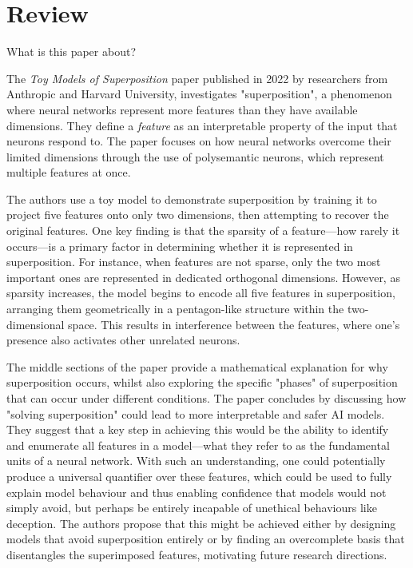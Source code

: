 \section{Review}
\label{sec:review}

What is this paper about?

The \textit{Toy Models of Superposition} paper \cite{elhage2022toy} published in 2022 by researchers from Anthropic and Harvard University, investigates "superposition", a phenomenon where neural networks represent more features than they have available dimensions.
They define a \textit{feature} as an interpretable property of the input that neurons respond to.
The paper focuses on how neural networks overcome their limited dimensions through the use of polysemantic neurons, which represent multiple features at once.

The authors use a toy model to demonstrate superposition by training it to project five features onto only two dimensions, then attempting to recover the original features.
One key finding is that the sparsity of a feature—how rarely it occurs—is a primary factor in determining whether it is represented in superposition. For instance, when features are not sparse, only the two most important ones are represented in dedicated orthogonal dimensions.
However, as sparsity increases, the model begins to encode all five features in superposition, arranging them geometrically in a pentagon-like structure within the two-dimensional space.
This results in interference between the features, where one's presence also activates other unrelated neurons.

The middle sections of the paper provide a mathematical explanation for why superposition occurs, whilst also exploring the specific "phases" of superposition that can occur under different conditions. 
The paper concludes by discussing how "solving superposition" could lead to more interpretable and safer AI models.
They suggest that a key step in achieving this would be the ability to identify and enumerate all features in a model—what they refer to as the fundamental units of a neural network.
With such an understanding, one could potentially produce a universal quantifier over these features, which could be used to fully explain model behaviour and thus enabling confidence that models would not simply avoid, but perhaps be entirely incapable of unethical behaviours like deception.
The authors propose that this might be achieved either by designing models that avoid superposition entirely or by finding an overcomplete basis that disentangles the superimposed features, motivating future research directions.

